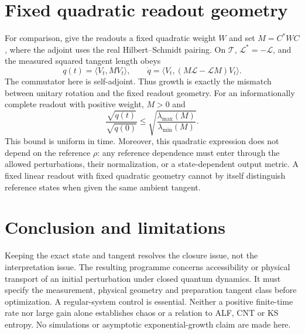 \documentclass[11pt,a4paper]{article}
\begin{document}
\section{Fixed quadratic readout geometry}
For comparison, give the readouts a fixed quadratic weight $W$ and set $M=C^\ast WC$, where the adjoint uses the real Hilbert--Schmidt pairing. On $\mathcal T$, $\mathcal L^\ast=-\mathcal L$, and the measured squared tangent length obeys
\[q(t)=\langle V_t,MV_t\rangle,\qquad\dot q=\langle V_t,(M\mathcal L-\mathcal LM)V_t\rangle.\]
The commutator here is self-adjoint. Thus growth is exactly the mismatch between unitary rotation and the fixed readout geometry. For an informationally complete readout with positive weight, $M>0$ and
\[\frac{\sqrt{q(t)}}{\sqrt{q(0)}}\leq\sqrt{\frac{\lambda_{\max}(M)}{\lambda_{\min}(M)}}.\]
This bound is uniform in time. Moreover, this quadratic expression does not depend on the reference $\rho$: any reference dependence must enter through the allowed perturbations, their normalization, or a state-dependent output metric. A fixed linear readout with fixed quadratic geometry cannot by itself distinguish reference states when given the same ambient tangent.
\section{Conclusion and limitations}
Keeping the exact state and tangent resolves the closure issue, not the interpretation issue. The resulting programme concerns accessibility or physical transport of an initial perturbation under closed quantum dynamics. It must specify the measurement, physical geometry and preparation tangent class before optimization. A regular-system control is essential. Neither a positive finite-time rate nor large gain alone establishes chaos or a relation to ALF, CNT or KS entropy. No simulations or asymptotic exponential-growth claim are made here.
\end{document}
